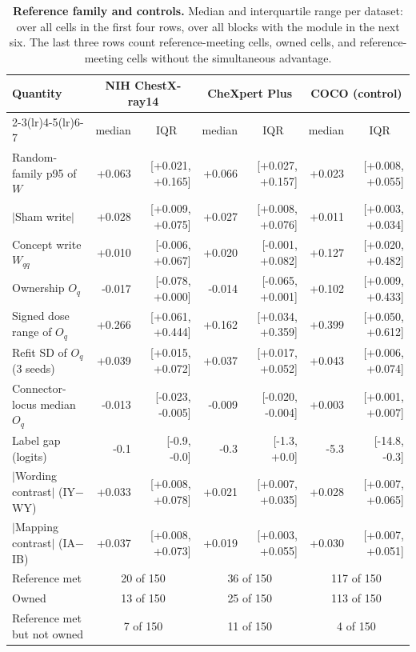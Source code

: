 \begin{table}[h]
\centering
\scriptsize
\setlength{\tabcolsep}{4pt}
\caption{\textbf{Reference family and controls.} Median and interquartile range per dataset: over all cells in the first four rows, over all blocks with the module in the next six. The last three rows count reference-meeting cells, owned cells, and reference-meeting cells without the simultaneous advantage.}
\label{tab:cf-controls}
\begin{tabular}{lrrrrrr}
\toprule
\multirow{2}{*}{Quantity} & \multicolumn{2}{c}{NIH ChestX-ray14} & \multicolumn{2}{c}{CheXpert Plus} & \multicolumn{2}{c}{COCO (control)}\\
\cmidrule(lr){2-3}\cmidrule(lr){4-5}\cmidrule(lr){6-7}
& \multicolumn{1}{c}{median} & \multicolumn{1}{c}{IQR} & \multicolumn{1}{c}{median} & \multicolumn{1}{c}{IQR} & \multicolumn{1}{c}{median} & \multicolumn{1}{c}{IQR}\\
\midrule
Random-family p95 of $W$ & +0.063 & [+0.021, +0.165] & +0.066 & [+0.027, +0.157] & +0.023 & [+0.008, +0.055] \\
$|$Sham write$|$ & +0.028 & [+0.009, +0.075] & +0.027 & [+0.008, +0.076] & +0.011 & [+0.003, +0.034] \\
Concept write $W_{qq}$ & +0.010 & [-0.006, +0.067] & +0.020 & [-0.001, +0.082] & +0.127 & [+0.020, +0.482] \\
Ownership $O_q$ & -0.017 & [-0.078, +0.000] & -0.014 & [-0.065, +0.001] & +0.102 & [+0.009, +0.433] \\
Signed dose range of $O_q$ & +0.266 & [+0.061, +0.444] & +0.162 & [+0.034, +0.359] & +0.399 & [+0.050, +0.612] \\
Refit SD of $O_q$ (3 seeds) & +0.039 & [+0.015, +0.072] & +0.037 & [+0.017, +0.052] & +0.043 & [+0.006, +0.074] \\
Connector-locus median $O_q$ & -0.013 & [-0.023, -0.005] & -0.009 & [-0.020, -0.004] & +0.003 & [+0.001, +0.007] \\
Label gap (logits) & -0.1 & [-0.9, -0.0] & -0.3 & [-1.3, +0.0] & -5.3 & [-14.8, -0.3] \\
$|$Wording contrast$|$ (IY$-$WY) & +0.033 & [+0.008, +0.078] & +0.021 & [+0.007, +0.035] & +0.028 & [+0.007, +0.065] \\
$|$Mapping contrast$|$ (IA$-$IB) & +0.037 & [+0.008, +0.073] & +0.019 & [+0.003, +0.055] & +0.030 & [+0.007, +0.051] \\
\midrule
Reference met & \multicolumn{2}{c}{20 of 150} & \multicolumn{2}{c}{36 of 150} & \multicolumn{2}{c}{117 of 150} \\
Owned & \multicolumn{2}{c}{13 of 150} & \multicolumn{2}{c}{25 of 150} & \multicolumn{2}{c}{113 of 150} \\
Reference met but not owned & \multicolumn{2}{c}{7 of 150} & \multicolumn{2}{c}{11 of 150} & \multicolumn{2}{c}{4 of 150} \\
\bottomrule
\end{tabular}
\end{table}
